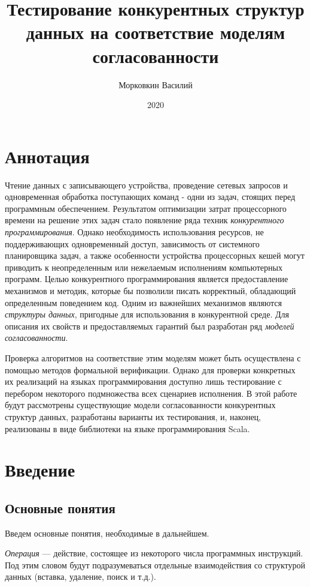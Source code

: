 \documentclass[14pt, openany]{book}
\title{Тестирование конкурентных структур данных на соответствие моделям согласованности}
\author{Морковкин Василий}
\date{2020}
\begin{document}
\maketitle
\chapter*{Аннотация}
\par
Чтение данных с записывающего устройства, проведение сетевых запросов и одновременная обработка поступающих команд - одни из задач, стоящих перед программным обеспечением. Результатом оптимизации затрат процессорного времени на решение этих задач стало появление ряда техник  \textit{конкурентного программирования}. Однако необходимость использования ресурсов, не поддерживающих одновременный доступ, зависимость от системного планировщика задач, а также особенности устройства процессорных кешей могут приводить к неопределенным или нежелаемым исполнениям компьютерных программ. Целью конкурентного программирования является предоставление механизмов и методик, которые бы позволили писать корректный, обладающий определенным поведением код. Одним из важнейших механизмов являются \textit{структуры данных}, пригодные для использования в конкурентной среде. Для описания их свойств и предоставляемых гарантий был разработан ряд \textit{моделей согласованности}. \par
Проверка алгоритмов на соответствие этим моделям может быть осуществлена с помощью методов формальной верификации. Однако для проверки конкретных их реализаций на языках программирования доступно лишь тестирование с перебором некоторого подмножества всех сценариев исполнения. В этой работе будут рассмотрены существующие модели согласованности конкурентных структур данных, разработаны варианты их тестирования, и, наконец, реализованы в виде библиотеки на языке программирования Scala.
\setcounter{page}{1}
\tableofcontents
\clearpage



\chapter{Введение}

\section{Основные понятия}
Введем основные понятия, необходимые в дальнейшем.

\emph{Операция} --- действие, состоящее из некоторого числа программных инструкций. Под этим словом будут подразумеваться отдельные взаимодействия со структурой данных (вставка, удаление, поиск и т.д.).
\end{document}
